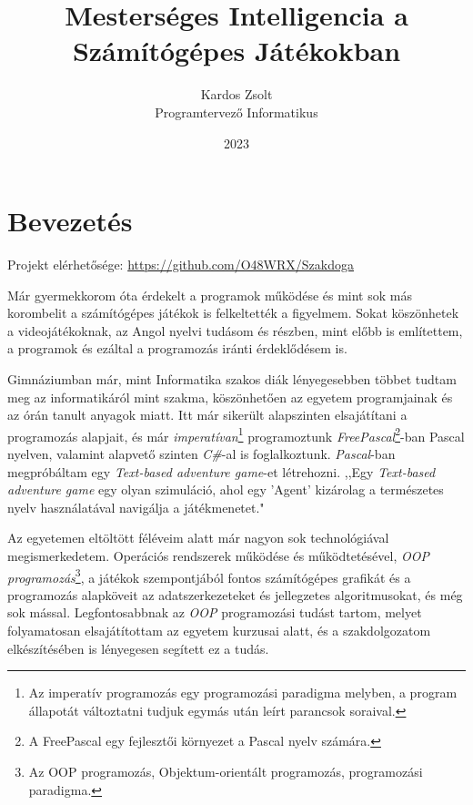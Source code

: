 \documentclass[]{thesis-ekf}
\theoremstyle{definition}
\begin{document}
	\title{Mesterséges Intelligencia a Számítógépes Játékokban}
	\author{Kardos Zsolt\\Programtervező Informatikus}
	\date{2023}
	\maketitle
	
	\tableofcontents
	
	\chapter*{Bevezetés}
	Projekt elérhetősége:
	\url{https://github.com/O48WRX/Szakdoga}
	
	Már gyermekkorom óta érdekelt a programok működése és mint sok más korombelit a számítógépes játékok is felkeltették a figyelmem.
	Sokat köszönhetek a videojátékoknak, az Angol nyelvi tudásom és
	részben, mint előbb is említettem, a programok és ezáltal a programozás iránti érdeklődésem is.
	
	Gimnáziumban már, mint Informatika szakos diák lényegesebben többet tudtam meg az informatikáról mint szakma, köszönhetően az egyetem programjainak és az órán tanult anyagok miatt. Itt már sikerült alapszinten elsajátítani a programozás alapjait, és már \emph{imperatívan}\footnote{Az imperatív programozás egy programozási paradigma melyben, a program állapotát változtatni tudjuk egymás után leírt parancsok soraival.} programoztunk \emph{FreePascal}\footnote{A FreePascal egy fejlesztői környezet a Pascal nyelv számára.}-ban Pascal nyelven, valamint alapvető szinten \emph{C\#}-al is foglalkoztunk. \emph{Pascal}-ban megpróbáltam egy \emph{Text-based adventure game}-et létrehozni.
	,,Egy \emph{Text-based adventure game} egy olyan szimuláció, ahol egy 'Agent' kizárolag a természetes nyelv használatával navigálja a játékmenetet."\cite{textb-ag}
	
	Az egyetemen eltöltött féléveim alatt már nagyon sok technológiával megismerkedetem. Operációs rendszerek működése és működtetésével, \emph{OOP programozás}\footnote{Az OOP programozás, Objektum-orientált programozás, programozási paradigma.}, a játékok szempontjából fontos számítógépes grafikát és a programozás alapköveit az adatszerkezeteket és jellegzetes algoritmusokat, és még sok mással.
	Legfontosabbnak az \emph{OOP} programozási tudást tartom, melyet folyamatosan elsajátítottam az egyetem kurzusai alatt, és a szakdolgozatom elkészítésében is lényegesen segített ez a tudás.
	
\end{document}
